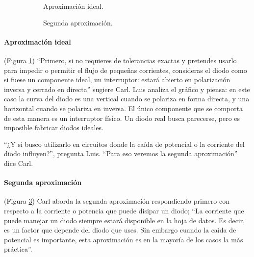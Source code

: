 \begin{figure}[!ht]
  \centering
  \begin{subfigure}[t]{0.45\textwidth}
    \centering
    \caption{Aproximación ideal.}
    \label{fig_aproximación_de_diodo_ideal}
  \end{subfigure}
  \hspace{1cm}
  \begin{subfigure}[t]{0.45\textwidth}
    \centering
    \caption{Segunda aproximación.}
    \label{fig_segunda_aproximación_de_diodo}
  \end{subfigure}
  \caption{}
\end{figure}

\paragraph{Aproximación ideal} (Figura \ref{fig_aproximación_de_diodo_ideal}) ``Primero, si no requieres de tolerancias exactas y pretendes usarlo para impedir o permitir el flujo de pequeñas corrientes, consideras el diodo como si fuese un componente ideal, un interruptor: estará abierto en polarización inversa y cerrado en directa'' sugiere Carl. Luis analiza el gráfico y piensa: en este caso la curva del diodo es una vertical cuando se polariza en forma directa, y una horizontal cuando se polariza en inversa. El único componente que se comporta de esta manera es un interruptor físico. Un diodo real busca parecerse, pero es imposible fabricar diodos ideales.

``¿Y si busco utilizarlo en circuitos donde la caída de potencial o la corriente del diodo influyen?'', pregunta Luis. ``Para eso veremos la segunda aproximación'' dice Carl.

\paragraph{Segunda aproximación} (Figura \ref{fig_segunda_aproximación_de_diodo}) Carl aborda la segunda aproximación respondiendo primero con respecto a la corriente o potencia que puede disipar un diodo; ``La corriente que puede manejar un diodo siempre estará disponible en la hoja de datos. Es decir, es un factor que depende del diodo que uses. Sin embargo cuando la caída de potencial es importante, esta aproximación es en la mayoría de los casos la más práctica''. 

